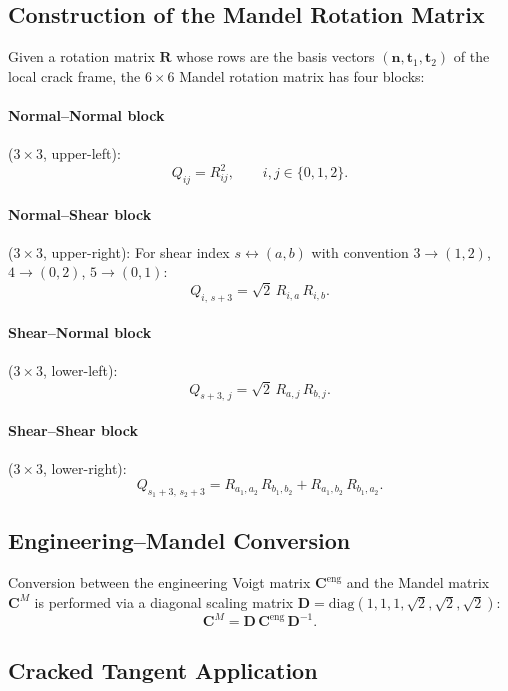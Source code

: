 \subsection{Construction of the Mandel Rotation Matrix}

Given a rotation matrix $\mathbf{R}$ whose rows are the basis vectors
$(\mathbf{n}, \mathbf{t}_1, \mathbf{t}_2)$ of the local crack frame, the
$6\times6$ Mandel rotation matrix has four blocks:

\paragraph{Normal--Normal block} ($3\times3$, upper-left):
\[
  Q_{ij} = R_{ij}^2, \qquad i, j \in \{0, 1, 2\}.
\]

\paragraph{Normal--Shear block} ($3\times3$, upper-right):
For shear index $s \leftrightarrow (a, b)$ with convention
$3 \to (1,2)$, $4 \to (0,2)$, $5 \to (0,1)$:
\[
  Q_{i,\,s+3} = \sqrt{2}\, R_{i,a}\, R_{i,b}.
\]

\paragraph{Shear--Normal block} ($3\times3$, lower-left):
\[
  Q_{s+3,\,j} = \sqrt{2}\, R_{a,j}\, R_{b,j}.
\]

\paragraph{Shear--Shear block} ($3\times3$, lower-right):
\[
  Q_{s_1+3,\,s_2+3} = R_{a_1, a_2}\, R_{b_1, b_2} + R_{a_1, b_2}\, R_{b_1, a_2}.
\]

\subsection{Engineering--Mandel Conversion}

Conversion between the engineering Voigt matrix $\mathbf{C}^{\text{eng}}$ and
the Mandel matrix $\mathbf{C}^M$ is performed via a diagonal scaling matrix
$\mathbf{D} = \mathrm{diag}(1, 1, 1, \sqrt{2}, \sqrt{2}, \sqrt{2})$:
\begin{equation}
  \mathbf{C}^M = \mathbf{D}\,\mathbf{C}^{\text{eng}}\,\mathbf{D}^{-1}.
  \label{eq:eng-mandel}
\end{equation}

\subsection{Cracked Tangent Application}


